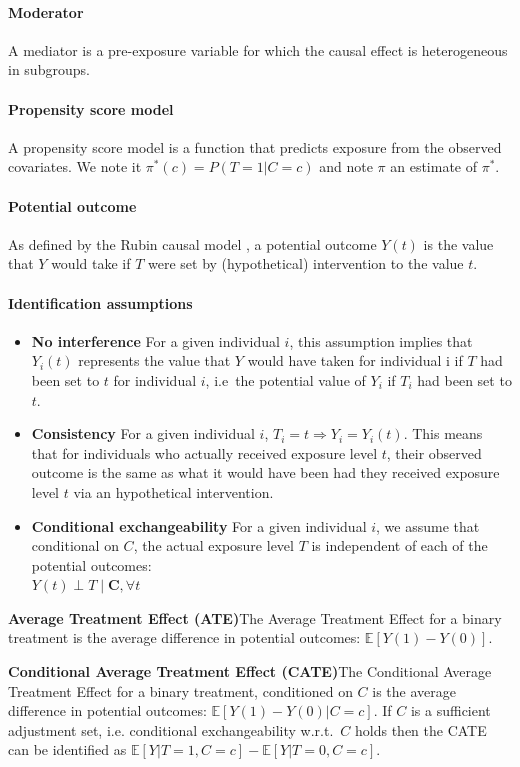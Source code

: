 \documentclass{article}
\theoremstyle{plain}
\theoremstyle{definition}
\theoremstyle{remark}
\theoremstyle{mystyle}
\begin{document}
\paragraph{Moderator}{A mediator is a pre-exposure variable for which the causal effect is heterogeneous in subgroups.}
\paragraph{Propensity score model}{A propensity score model is a function that predicts exposure from the observed covariates. We note it $\pi^*(c) = P(T=1|C=c)$ and note $\pi$ an estimate of $\pi^*$.}
\paragraph{Potential outcome}{As defined by the Rubin causal model , a potential outcome $Y(t)$ is the value that $Y$ would take if $T$ were set by (hypothetical) intervention to the value $t$.}
\paragraph{Identification assumptions}
\begin{itemize}
    \item \textbf{No interference} For a given individual $i$, this assumption implies that $Y_i(t)$ represents the value that $Y$ would have taken for individual i if $T$ had been set to $t$ for individual $i$, i.e\ the potential value of $Y_i$ if $T_i$ had been set to $t$.
    \item \textbf{Consistency} For a given individual $i$, $T_{i}=t \Rightarrow Y_{i}=Y_{i}(t)$. This means that for individuals who actually received exposure level $t$, their observed outcome is the same as what it would have been had they received exposure level $t$ via an hypothetical intervention. 
    \item \textbf{Conditional exchangeability} For a given individual $i$, we assume that conditional on $C$, the actual exposure level $T$ is independent of each of the potential outcomes: \\
    $Y(t) \perp T \mid \mathbf{C}, \forall t$
\end{itemize}
\textbf{Average Treatment Effect (ATE)}{The Average Treatment Effect for a binary treatment is the average difference in potential outcomes: $\mathbb{E}[Y(1)-Y(0)]$}.

\textbf{Conditional Average Treatment Effect (CATE)}{The Conditional Average Treatment Effect for a binary treatment, conditioned on $C$ is the average difference in potential outcomes: $\mathbb{E}[Y(1)-Y(0)|C=c]$. If $C$ is a sufficient adjustment set, i.e. conditional exchangeability w.r.t.~$C$ holds then the CATE can be identified as $\mathbb{E}[Y|T=1,C=c]-\mathbb{E}[Y|T=0,C=c]$.}
\end{document}
